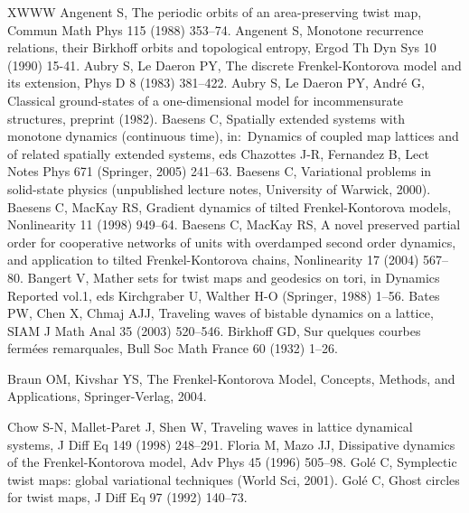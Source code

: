 \documentclass[12pt]{article}
\begin{document}
\newpage
\begin{thebibliography}{XWWW}
 Angenent S, The periodic orbits of an area-preserving twist map, Commun Math Phys 115 (1988) 353--74.
 Angenent S, Monotone recurrence relations, their Birkhoff orbits and topological entropy, Ergod Th Dyn Sys 10 (1990) 15-41.
 Aubry S, Le Daeron PY, The discrete Frenkel-Kontorova model and its extension, Phys D 8 (1983) 381--422.
 Aubry S, Le Daeron PY, Andr\'e G, Classical ground-states of a one-dimensional model for incommensurate structures, preprint (1982).
 Baesens C, Spatially extended systems with monotone dynamics (continuous time), in:~Dynamics of coupled map lattices and of related spatially extended systems, eds Chazottes J-R, Fernandez B, Lect Notes Phys 671 (Springer, 2005) 241--63.
 Baesens C, Variational problems in solid-state physics (unpublished lecture notes, University of Warwick, 2000).
 Baesens C, MacKay RS, Gradient dynamics of tilted Frenkel-Kontorova models, Nonlinearity 11 (1998) 949--64.
 Baesens C, MacKay RS, A novel preserved partial order for cooperative networks of units with overdamped second order dynamics, and application to tilted Frenkel-Kontorova chains, Nonlinearity 17 (2004) 567--80.
 Bangert V, Mather sets for twist maps and geodesics on tori, in Dynamics Reported vol.1, eds Kirchgraber U, Walther H-O (Springer, 1988) 1--56.
 Bates PW, Chen X, Chmaj AJJ, Traveling waves of bistable dynamics on a lattice, SIAM J Math Anal 35 (2003) 520--546.
 Birkhoff GD, Sur quelques courbes ferm\'{e}es remarquales, Bull Soc Math France 60 (1932) 1--26.

 Braun OM, Kivshar YS, The
Frenkel-Kontorova Model, Concepts, Methods, and Applications,
Springer-Verlag, 2004.




 Chow S-N, Mallet-Paret J, Shen W, Traveling waves in lattice dynamical systems, J Diff Eq 149 (1998) 248--291.
 Floria M, Mazo JJ, Dissipative dynamics of the Frenkel-Kontorova model, Adv Phys 45 (1996) 505--98.
 Gol\'e C, Symplectic twist maps: global variational techniques (World Sci, 2001).
 Gol\'e C, Ghost circles for twist maps, J Diff Eq 97 (1992) 140--73.


\end{thebibliography}
\end{document}
